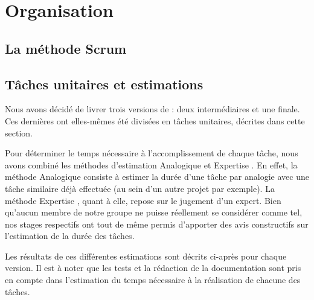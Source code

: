 \section{Organisation}
	\subsection{La méthode Scrum}

	
	\subsection{Tâches unitaires et estimations}
	\label{sec:taches_unitaires}

	Nous avons décidé de livrer trois versions de \glasir{} : deux intermédiaires et une finale. Ces dernières ont elles-mêmes été divisées en tâches unitaires, décrites dans cette section.
	
	Pour déterminer le temps nécessaire à l'accomplissement de chaque tâche, nous avons combiné les méthodes d’estimation \og Analogique \fg{} et \og Expertise \fg{}. En effet, la méthode \og Analogique \fg{} consiste à estimer la durée d'une tâche par analogie avec une tâche similaire déjà effectuée (au sein d'un autre projet par exemple). La méthode \og Expertise \fg{}, quant à elle, repose sur le jugement d'un expert. Bien qu'aucun membre de notre groupe ne puisse réellement se considérer comme tel, nos stages respectifs ont tout de même permis d'apporter des avis constructifs sur l'estimation de la durée des tâches.
	
	Les résultats de ces différentes estimations sont décrits ci-après pour chaque version. Il est à noter que les tests et la rédaction de la documentation sont pris en compte dans l'estimation du temps nécessaire à la réalisation de chacune des tâches.
	


